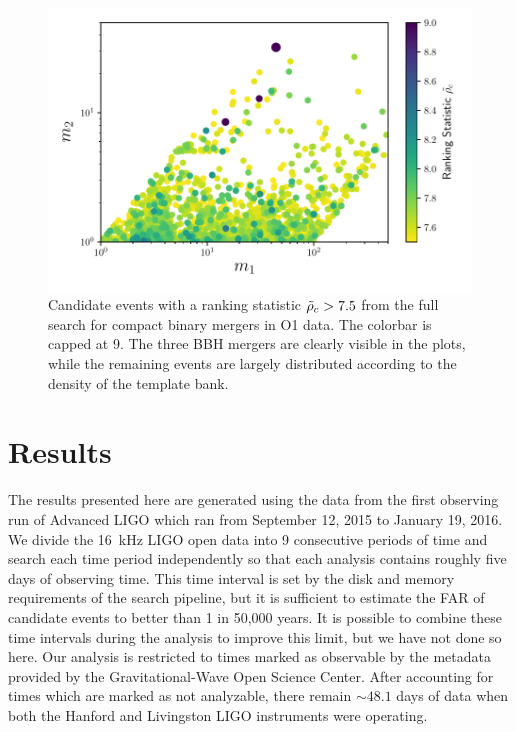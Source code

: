 \begin{figure}[]
  \centering
    \includegraphics[width=\columnwidth]{figs/chapter4/candidates.pdf}
\caption{Candidate events with a ranking statistic $\tilde{\rho}_c>7.5$ from the full search for compact binary mergers in O1 data. The colorbar is capped at 9. The three BBH mergers are clearly visible in the plots, while the remaining events are largely distributed according to the density 
of the template bank.}
\label{fig:bankcandidates}
\end{figure}

\section{Results}
\label{sec:results}


The results presented here are generated using the data from the first observing run of Advanced LIGO which ran from September 12, 2015 to January 19, 2016. We divide the 16~kHz LIGO open data into 9 consecutive periods of time and search each time period independently so that each analysis contains roughly five days of observing time. This time interval is set by the disk and memory requirements of the search pipeline, but it is sufficient to estimate the FAR of candidate events to better than 1 in 50,000 years. It is possible to combine these time intervals during the analysis to improve this limit, but we have not done so here. Our analysis is restricted to times marked as observable by the metadata provided by the Gravitational-Wave Open Science Center. After accounting for times which are marked as not analyzable, there remain $\sim48.1$ days of data when both the Hanford and Livingston LIGO instruments were operating.

